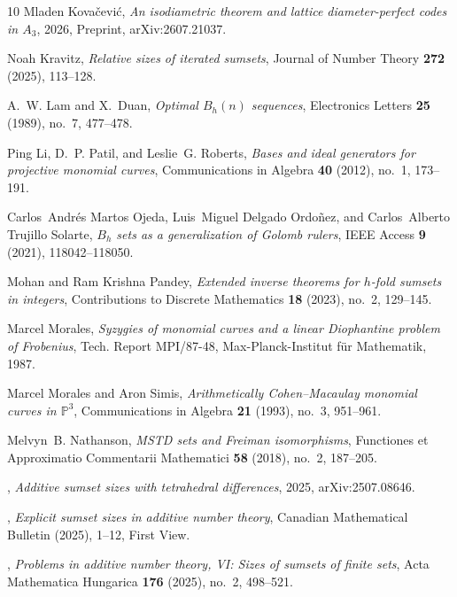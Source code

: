 \documentclass[11pt,reqno]{amsart}
\theoremstyle{definition}
\theoremstyle{remark}
\begin{document}
\begin{sloppypar}
\begin{thebibliography}{10}
Mladen Kova\v{c}evi\'{c}, \emph{An isodiametric theorem and lattice diameter-perfect codes in {$A_3$}}, 2026, Preprint, arXiv:2607.21037.

Noah Kravitz, \emph{Relative sizes of iterated sumsets}, Journal of Number Theory \textbf{272} (2025), 113--128.

A.~W. Lam and X.~Duan, \emph{Optimal {$B_h(n)$} sequences}, Electronics Letters \textbf{25} (1989), no.~7, 477--478.

Ping Li, D.~P. Patil, and Leslie~G. Roberts, \emph{Bases and ideal generators for projective monomial curves}, Communications in Algebra \textbf{40} (2012), no.~1, 173--191.

Carlos~Andr{\'e}s {Martos Ojeda}, Luis~Miguel {Delgado Ordo{\~n}ez}, and Carlos~Alberto {Trujillo Solarte}, \emph{{$B_h$} sets as a generalization of {Golomb} rulers}, IEEE Access \textbf{9} (2021), 118042--118050.

Mohan and Ram Krishna Pandey, \emph{Extended inverse theorems for {$h$}-fold sumsets in integers}, Contributions to Discrete Mathematics \textbf{18} (2023), no.~2, 129--145.

Marcel Morales, \emph{Syzygies of monomial curves and a linear {Diophantine} problem of {Frobenius}}, Tech. Report MPI/87-48, Max-Planck-Institut f\"ur Mathematik, 1987.

Marcel Morales and Aron Simis, \emph{Arithmetically {Cohen--Macaulay} monomial curves in {${\mathbb P}^3$}}, Communications in Algebra \textbf{21} (1993), no.~3, 951--961.

Melvyn~B. Nathanson, \emph{{MSTD} sets and {Freiman} isomorphisms}, Functiones et Approximatio Commentarii Mathematici \textbf{58} (2018), no.~2, 187--205.

\bysame, \emph{Additive sumset sizes with tetrahedral differences}, 2025, arXiv:2507.08646.

\bysame, \emph{Explicit sumset sizes in additive number theory}, Canadian Mathematical Bulletin (2025), 1--12, First View.

\bysame, \emph{Problems in additive number theory, {VI}: Sizes of sumsets of finite sets}, Acta Mathematica Hungarica \textbf{176} (2025), no.~2, 498--521.


\end{thebibliography}
\end{sloppypar}
\end{document}
